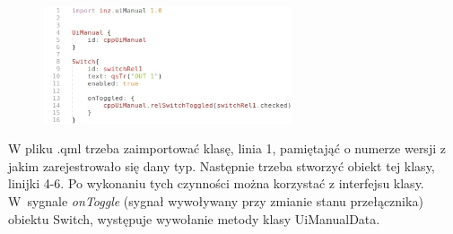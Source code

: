 \documentclass[12pt, eng, twoside, openany, final]{mgr}
\begin{document}
                    \begin{figure}[H]
                    \begin{center}
                        \includegraphics[width=0.65\textwidth]{code_qml.jpg}
                    \end{center}
                    \end{figure}
      \noindent              W pliku .qml trzeba zaimportować klasę, linia 1, pamiętająć o numerze wersji z~ jakim zarejestrowało się dany typ. Następnie trzeba stworzyć obiekt tej klasy, linijki 4-6.
                    Po wykonaniu tych czynności można korzystać z interfejsu klasy. W~sygnale \emph{onToggle} (sygnał wywoływany przy zmianie stanu przełącznika) obiektu Switch, występuje wywołanie metody klasy UiManualData.
                
                \newpage
                
                
\end{document}
